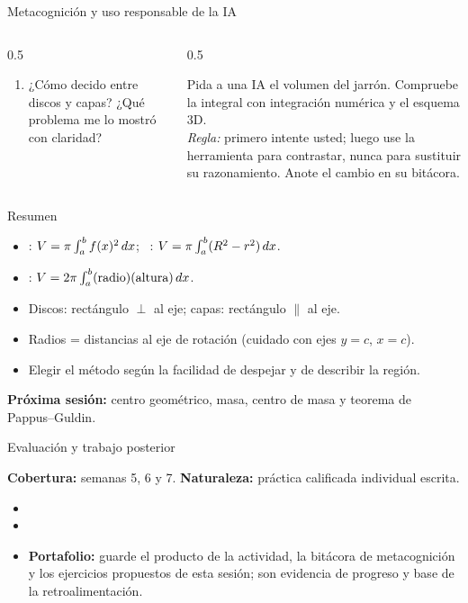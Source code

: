 \documentclass[10pt,aspectratio=169]{beamer}
\begin{document}
\begin{frame}{Metacognición y uso responsable de la IA}
  \small
  \begin{columns}[t]
    \begin{column}{0.5\textwidth}
      \begin{metacog}
        \begin{enumerate}
          \metacomun
          \item ¿Cómo decido entre discos y capas? ¿Qué problema me lo mostró con claridad?
        \end{enumerate}
      \end{metacog}
    \end{column}
    \begin{column}{0.5\textwidth}
      \begin{iabox}
        Pida a una IA el volumen del jarrón. Compruebe la integral con integración numérica y el esquema 3D.\\[2pt]
        \textit{Regla:} primero intente usted; luego use la herramienta para contrastar, nunca para sustituir su razonamiento. Anote el cambio en su bitácora.
      \end{iabox}
    \end{column}
  \end{columns}
\end{frame}

\begin{frame}{Resumen}
  \begin{itemize}
    \item {}: $V=\pi\int_a^b f(x)^2\,dx$; \ : $V=\pi\int_a^b(R^2-r^2)\,dx$.
    \item {}: $V=2\pi\int_a^b(\text{radio})(\text{altura})\,dx$.
    \item Discos: rectángulo $\perp$ al eje; capas: rectángulo $\parallel$ al eje.
    \item Radios = distancias al eje de rotación (cuidado con ejes $y=c$, $x=c$).
    \item Elegir el método según la facilidad de despejar y de describir la región.
  \end{itemize}
  \vspace{3mm}
  \textbf{Próxima sesión:} centro geométrico, masa, centro de masa y teorema de Pappus--Guldin.
\end{frame}


\begin{frame}{Evaluación y trabajo posterior}
  \small
  \begin{evalbox}
    \textbf{Cobertura:} semanas 5, 6 y 7. \textbf{Naturaleza:} práctica calificada individual escrita.
  \end{evalbox}
  \begin{itemize}
    \item \criterios
    \item \declaracionia
    \item \textbf{Portafolio:} guarde el producto de la actividad, la bitácora de metacognición y los ejercicios propuestos de esta sesión; son evidencia de progreso y base de la retroalimentación.
  \end{itemize}
\end{frame}
\end{document}
